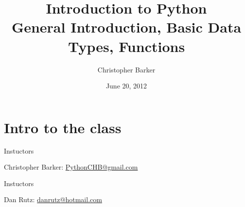 \documentclass{beamer}
\title[Intro to Python: Week 1]{Introduction  to Python\\ General Introduction, Basic Data Types, Functions}
\author{Christopher Barker}
\institute{UW Continuing Education}
\date{June 20, 2012}
\begin{document}
\begin{frame}
\titlepage
\end{frame}

\section{Intro to the class}

\begin{frame}{Instuctors}

Christopher Barker: \url{PythonCHB@gmail.com}

\end{frame}


\begin{frame}{Instuctors}

Dan Rutz: \url{danrutz@hotmail.com}

\end{frame}
\end{document}
